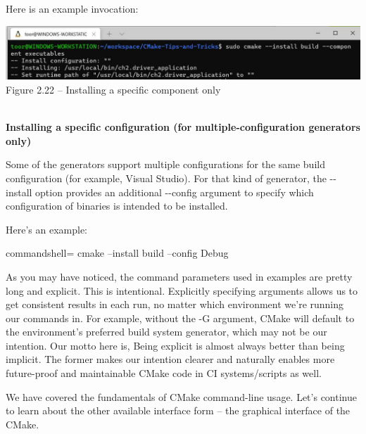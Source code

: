 Here is an example invocation:

\begin{center}
\includegraphics[width=1.\textwidth]{content/1/chapter2/images/22.jpg}\\
Figure 2.22 – Installing a specific component only
\end{center}

\hspace*{\fill} \\ %
\noindent
\textbf{Installing a specific configuration (for multiple-configuration 	generators only)}

Some of the generators support multiple configurations for the same build configuration (for example, Visual Studio). For that kind of generator, the -{}-install option provides an additional -{}-config argument to specify which configuration of binaries is intended to be installed.

Here's an example:

\begin{tcblisting}{commandshell={}}
cmake --install build --config Debug
\end{tcblisting}

\begin{tcolorbox}[colback=webgreen!5!white,colframe=webgreen!75!black,title=Note]
As you may have noticed, the command parameters used in examples are pretty long and explicit. This is intentional. Explicitly specifying arguments allows us to get consistent results in each run, no matter which environment we're running our commands in. For example, without the -G argument, CMake will default to the environment's preferred build system generator, which may not be our intention. Our motto here is, Being explicit is almost always better than being implicit. The former makes our intention clearer and naturally enables more future-proof and maintainable CMake code in CI systems/scripts as well.
\end{tcolorbox}

We have covered the fundamentals of CMake command-line usage. Let's continue to learn about the other available interface form – the graphical interface of the CMake.











